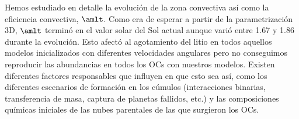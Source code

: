Hemos estudiado en detalle la evolución de la zona convectiva así como la eficiencia convectiva, $\amlt$. Como era de esperar a partir de la parametrización 3D, $\amlt$ terminó en el valor solar del Sol actual aunque varió entre 1.67 y 1.86 durante la evolución. Esto afectó al agotamiento del litio en todos aquellos modelos inicializados con diferentes velocidades angulares pero no conseguimos reproducir las abundancias en todos los OCs con nuestros modelos. Existen diferentes factores responsables que influyen en que esto sea así, como los diferentes escenarios de formación en los cúmulos (interacciones binarias, transferencia de masa, captura de planetas fallidos, etc.) y las composiciones químicas iniciales de las nubes parentales de las que surgieron los OCs.\par

\endinput

